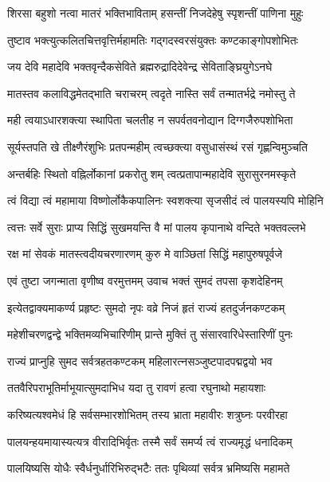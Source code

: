 \twolineshloka
{शिरसा बहुशो नत्वा मातरं भक्तिभाविताम्}
{हसन्तीं निजदेहेषु स्पृशन्तीं पाणिना मुहुः}%

\twolineshloka
{तुष्टाव भक्त्युत्कलितचित्तवृत्तिर्महामतिः}
{गद्गदस्वरसंयुक्तः कण्टकाङ्गोपशोभितः}%

\twolineshloka
{जय देवि महादेवि भक्तवृन्दैकसेविते}
{ब्रह्मरुद्रादिदेवेन्द्र सेविताङ्घ्रियुगेऽनघे}%

\twolineshloka
{मातस्तव कलाविद्धमेतद्भाति चराचरम्}
{त्वदृते नास्ति सर्वं तन्मातर्भद्रे नमोस्तु ते}%

\twolineshloka
{मही त्वयाऽधारशक्त्या स्थापिता चलतीह न}
{सपर्वतवनोद्यान दिग्गजैरुपशोभिता}%

\twolineshloka
{सूर्यस्तपति खे तीक्ष्णैरंशुभिः प्रतपन्महीम्}
{त्वच्छक्त्या वसुधासंस्थं रसं गृह्णन्विमुञ्चति}%

\twolineshloka
{अन्तर्बहिः स्थितो वह्निर्लोकानां प्रकरोतु शम्}
{त्वत्प्रतापान्महादेवि सुरासुरनमस्कृते}%

\twolineshloka
{त्वं विद्या त्वं महामाया विष्णोर्लोकैकपालिनः}
{स्वशक्त्या सृजसीदं त्वं पालयस्यपि मोहिनि}%

\twolineshloka
{त्वत्तः सर्वे सुराः प्राप्य सिद्धिं सुखमयन्ति वै}
{मां पालय कृपानाथे वन्दिते भक्तवल्लभे}%

\twolineshloka
{रक्ष मां सेवकं मातस्त्वदीयचरणारणम्}
{कुरु मे वाञ्छितां सिद्धिं महापुरुषपूर्वजे}%


\twolineshloka
{एवं तुष्टा जगन्माता वृणीष्व वरमुत्तमम्}
{उवाच भक्तं सुमदं तपसा कृशदेहिनम्}%

\twolineshloka
{इत्येतद्वाक्यमाकर्ण्य प्रहृष्टः सुमदो नृपः}
{वव्रे निजं हृतं राज्यं हतदुर्जनकण्टकम्}%

\twolineshloka
{महेशीचरणद्वन्द्वे भक्तिमव्यभिचारिणीम्}
{प्रान्ते मुक्तिं तु संसारवारिधेस्तारिणीं पुनः}%


\twolineshloka
{राज्यं प्राप्नुहि सुमद सर्वत्रहतकण्टकम्}
{महिलारत्नसञ्जुष्टपादपद्मद्वयो भव}%

\twolineshloka
{ततवैरिपराभूतिर्माभूयात्सुमदाभिध}
{यदा तु रावणं हत्वा रघुनाथो महायशाः}%

\twolineshloka
{करिष्यत्यश्वमेधं हि सर्वसम्भारशोभितम्}
{तस्य भ्राता महावीरः शत्रुघ्नः परवीरहा}%

\twolineshloka
{पालयन्हयमायास्यत्यत्र वीरादिभिर्वृतः}
{तस्मै सर्वं समर्प्य त्वं राज्यमृद्धं धनादिकम्}%

\twolineshloka
{पालयिष्यसि योधैः स्वैर्धनुर्धारिभिरुद्भटैः}
{ततः पृथिव्यां सर्वत्र भ्रमिष्यसि महामते}%

